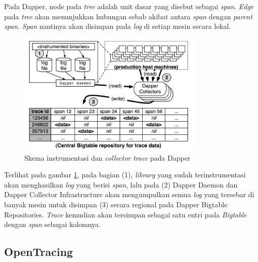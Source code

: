 Pada Dapper, node pada \textit{tree} adalah unit dasar yang disebut sebagai \textit{span}. \textit{Edge} pada \textit{tree} akan menunjukkan hubungan sebab akibat antara \textit{span} dengan \textit{parent span}. \textit{Span} nantinya akan disimpan pada \textit{log} di setiap mesin secara lokal. 
\begin{figure}[htb]
	\centering
	\includegraphics[width=0.8\textwidth]{resources/ch2/dapper-1.png}
	\caption{Skema instrumentasi dan \textit{collector} \textit{trace} pada Dapper \citep{dapper-paper}}
	\label{ch2-dapper-1}
\end{figure}

Terlihat pada gambar \ref{ch2-dapper-1}, pada bagian (1), \textit{library} yang sudah terinstrumentasi akan menghasilkan \textit{log} yang berisi \textit{span}, lalu pada (2) Dapper Daemon dan Dapper Collector Infrastructure akan mengumpulkan semua \textit{log} yang tersebar di banyak mesin untuk disimpan (3) secara regional pada Dapper Bigtable Repositories. \textit{Trace} kemudian akan tersimpan sebagai satu entri pada \textit{Bigtable} dengan \textit{span} sebagai kolomnya. 

\subsection{OpenTracing}

